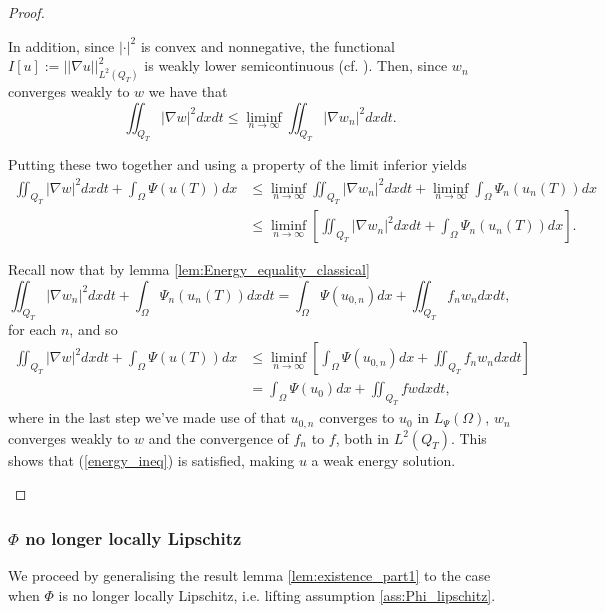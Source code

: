 \documentclass[11pt, a4paper]{article}
\begin{document}
\begin{proof}
\begin{description}
	In addition, since $|\cdot|^2$ is convex and nonnegative, the functional $I[u]:= ||\nabla u||^2_{L^2(Q_T)}$ is weakly lower semicontinuous (cf. \citep[Theorem 1, p. 468]{evans}). Then, since $w_n$ converges weakly to $w$ we have that
	\begin{equation}
	\iint_{Q_T}|\nabla w|^2 dxdt \leq \liminf_{n \to \infty} \iint_{Q_T} |\nabla w_n|^2 dxdt.
	\end{equation}
	
	Putting these two together and using a property of the limit inferior yields
	\begin{align*}
	\iint_{Q_T}|\nabla w|^2dxdt + \int_\Omega \Psi(u(T))dx &\leq \liminf_{n \to \infty} \iint_{Q_T} |\nabla w_n|^2 dxdt + \liminf_{n \to \infty} \int_\Omega \Psi_n(u_n(T))dx \\
	&\leq \liminf_{n \to \infty} \left[ \iint_{Q_T} |\nabla w_n|^2 dxdt + \int_\Omega \Psi_n(u_n(T))dx \right].
	\end{align*}
	
	Recall now that by lemma \ref{lem:Energy_equality_classical} 
	\begin{equation*}
	\iint_{Q_T} |\nabla w_n|^2 dxdt + \int_\Omega \Psi_n(u_n(T))dxdt = \int_\Omega \Psi(u_{0,n})dx + \iint_{Q_T}f_n w_n dxdt,
	\end{equation*}
	for each $n$, and so
	\begin{align*}
	\iint_{Q_T}|\nabla w|^2dxdt + \int_\Omega \Psi(u(T))dx &\leq \liminf_{n \to \infty} \left[\int_\Omega \Psi(u_{0,n})dx + \iint_{Q_T}f_n w_n dxdt \right] \\
	&= \int_\Omega \Psi(u_0)dx + \iint_{Q_T} f w dxdt,
	\end{align*}
	where in the last step we've made use of that $u_{0,n}$ converges to $u_0$ in $L_{\Psi}(\Omega)$, $w_n$ converges weakly to $w$ and the convergence of $f_n$ to $f$, both in $L^2(Q_T)$. This shows that (\ref{energy_ineq}) is satisfied, making $u$ a weak energy solution.
\end{description}

\end{proof}



\subsubsection{$\Phi$ no longer locally Lipschitz}
We proceed by generalising the result lemma \ref{lem:existence_part1} to the case when $\Phi$ is no longer locally Lipschitz, i.e. lifting assumption \ref{ass:Phi_lipschitz}.
\end{document}
